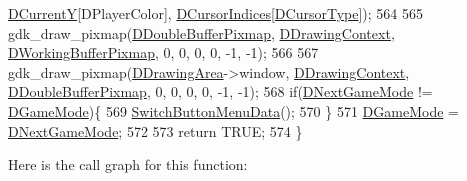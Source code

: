 \begin{DoxyCode}
      \hyperlink{classCApplicationData_a0ba39779ae11c8072258c6ddfebd6052}{DCurrentY}[DPlayerColor], \hyperlink{classCApplicationData_a3f4e69d928f933bba6e1c388c5a720a2}{DCursorIndices}[\hyperlink{classCApplicationData_a931cfbda23231fb441081f231326e7ee}{DCursorType}]);   
564     
565     gdk\_draw\_pixmap(\hyperlink{classCApplicationData_aefb64ec5ca3f791f6d431cfc56b9f3b3}{DDoubleBufferPixmap}, \hyperlink{classCApplicationData_aa6c5bea9bdcc64398e5a3f693661d37c}{DDrawingContext}, 
      \hyperlink{classCApplicationData_afa34cf2780f38dd28c0c811e69d60a97}{DWorkingBufferPixmap}, 0, 0, 0, 0, -1, -1);
566     
567     gdk\_draw\_pixmap(\hyperlink{classCApplicationData_a4735f5d31632313e0b2a1659eb178987}{DDrawingArea}->window, \hyperlink{classCApplicationData_aa6c5bea9bdcc64398e5a3f693661d37c}{DDrawingContext}, 
      \hyperlink{classCApplicationData_aefb64ec5ca3f791f6d431cfc56b9f3b3}{DDoubleBufferPixmap}, 0, 0, 0, 0, -1, -1);
568     \textcolor{keywordflow}{if}(\hyperlink{classCApplicationData_a3b67edeacd70201dcf96fa9fa8aa2107}{DNextGameMode} != \hyperlink{classCApplicationData_a2f906f2b4208ecb2a057e6b62e549685}{DGameMode})\{
569         \hyperlink{classCApplicationData_a2a464fd480c791ab13a1b1ca855e4578}{SwitchButtonMenuData}();
570     \}
571     \hyperlink{classCApplicationData_a2f906f2b4208ecb2a057e6b62e549685}{DGameMode} = \hyperlink{classCApplicationData_a3b67edeacd70201dcf96fa9fa8aa2107}{DNextGameMode};
572     
573     \textcolor{keywordflow}{return} TRUE;
574 \}
\end{DoxyCode}
Here is the call graph for this function\+:
\nopagebreak
